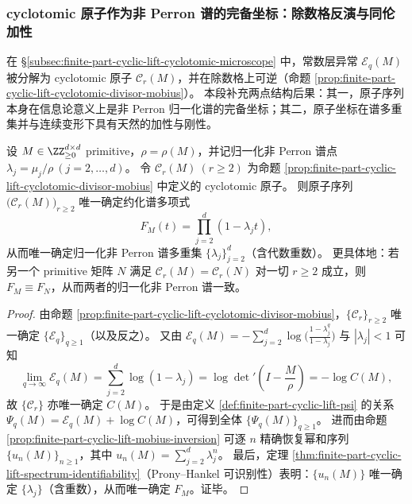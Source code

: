 \subsubsection{cyclotomic 原子作为非 Perron 谱的完备坐标：除数格反演与同伦加性}\label{subsubsec:finite-part-cyclotomic-atoms-complete-coordinates}
在 \S\ref{subsec:finite-part-cyclic-lift-cyclotomic-microscope} 中，常数层异常 \(\mathcal{E}_q(M)\) 被分解为 cyclotomic 原子 \(\mathcal{C}_r(M)\)，并在除数格上可逆（命题 \ref{prop:finite-part-cyclic-lift-cyclotomic-divisor-mobius}）。
本段补充两点结构后果：其一，原子序列本身在信息论意义上是非 Perron 归一化谱的完备坐标；其二，原子坐标在谱多重集并与连续变形下具有天然的加性与刚性。

\begin{theorem}\label{thm:finite-part-cyclotomic-atoms-complete-coordinate}
设 \(M\in\ZZ_{\ge0}^{d\times d}\) primitive，\(\rho=\rho(M)\)，并记归一化非 Perron 谱点 \(\lambda_j=\mu_j/\rho\ (j=2,\dots,d)\)。
令 \(\mathcal{C}_r(M)\ (r\ge2)\) 为命题 \ref{prop:finite-part-cyclic-lift-cyclotomic-divisor-mobius} 中定义的 cyclotomic 原子。
则原子序列 \(\bigl(\mathcal{C}_r(M)\bigr)_{r\ge2}\) 唯一确定约化谱多项式
\[
F_M(t)=\prod_{j=2}^{d}(1-\lambda_j t),
\]
从而唯一确定归一化非 Perron 谱多重集 \(\{\lambda_j\}_{j=2}^{d}\)（含代数重数）。
更具体地：若另一个 primitive 矩阵 \(N\) 满足
\(
\mathcal{C}_r(M)=\mathcal{C}_r(N)
\)
对一切 \(r\ge2\) 成立，则 \(F_M\equiv F_N\)，从而两者的归一化非 Perron 谱一致。
\end{theorem}
\begin{proof}
由命题 \ref{prop:finite-part-cyclic-lift-cyclotomic-divisor-mobius}，\(\{\mathcal{C}_r\}_{r\ge2}\) 唯一确定 \(\{\mathcal{E}_q\}_{q\ge1}\)（以及反之）。
又由 \(\mathcal{E}_q(M)=-\sum_{j=2}^{d}\log\!\bigl(\frac{1-\lambda_j^{q}}{1-\lambda_j}\bigr)\) 与 \(|\lambda_j|<1\) 可知
\[
\lim_{q\to\infty}\mathcal{E}_q(M)=\sum_{j=2}^{d}\log(1-\lambda_j)=\log\det\nolimits'\!\left(I-\frac{M}{\rho}\right)=-\log C(M),
\]
故 \(\{\mathcal{C}_r\}\) 亦唯一确定 \(C(M)\)。
于是由定义 \ref{def:finite-part-cyclic-lift-psi} 的关系 \(\Psi_q(M)=\mathcal{E}_q(M)+\log C(M)\)，可得到全体 \(\{\Psi_q(M)\}_{q\ge1}\)。
进而由命题 \ref{prop:finite-part-cyclic-lift-mobius-inversion} 可逐 \(n\) 精确恢复幂和序列 \(\{u_n(M)\}_{n\ge1}\)，其中 \(u_n(M)=\sum_{j=2}^{d}\lambda_j^{n}\)。
最后，定理 \ref{thm:finite-part-cyclic-lift-spectrum-identifiability}（Prony--Hankel 可识别性）表明：\(\{u_n(M)\}\) 唯一确定 \(\{\lambda_j\}\)（含重数），从而唯一确定 \(F_M\)。证毕。
\end{proof}

